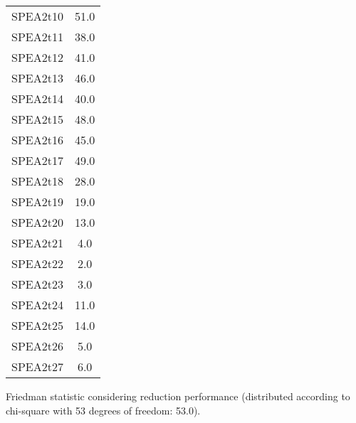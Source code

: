 \documentclass{article}
\begin{document}
\begin{table}[!htp]
\begin{tabular}{c|c}
SPEA2t10&51.0\\
SPEA2t11&38.0\\
SPEA2t12&41.0\\
SPEA2t13&46.0\\
SPEA2t14&40.0\\
SPEA2t15&48.0\\
SPEA2t16&45.0\\
SPEA2t17&49.0\\
SPEA2t18&28.0\\
SPEA2t19&19.0\\
SPEA2t20&13.0\\
SPEA2t21&4.0\\
SPEA2t22&2.0\\
SPEA2t23&3.0\\
SPEA2t24&11.0\\
SPEA2t25&14.0\\
SPEA2t26&5.0\\
SPEA2t27&6.0\\
\end{tabular}
\end{table}


Friedman statistic considering reduction performance (distributed according to chi-square with 53 degrees of freedom: 53.0).
\end{document}
